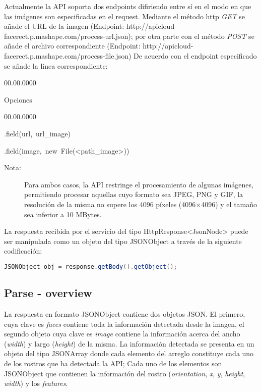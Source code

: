 Actualmente la API soporta dos endpoints difiriendo entre sí en el
modo en que las imágenes son especificadas en el request. Mediante
el método http \emph{GET} se añade el URL de la imagen (Endpoint:
http://apicloud-facerect.p.mashape.com/process-url.json); por otra
parte con el método \emph{POST} se añade el archivo correspondiente
(Endpoint: http://apicloud-facerect.p.mashape.com/process-file.json)
De acuerdo con el endpoint especificado se añade la línea correspondiente: 
\begin{lyxlist}{00.00.0000}
\item [{Opciones}]~

\begin{lyxlist}{00.00.0000}
\item [{.field(url,~url\_image)}]~
\item [{.field(image,~new~File(<path\_image>))}]~
\end{lyxlist}
\end{lyxlist}
\begin{description}
\item [{Nota:}] Para ambos casos, la API restringe el procesamiento de
algunas imágenes, permitiendo procesar aquellas cuyo formato sea JPEG,
PNG y GIF, la resolución de la misma no supere los 4096 píxeles (4096×4096)
y el tamaño sea inferior a 10 MBytes. 
\end{description}
La respuesta recibida por el servicio del tipo HttpResponse<JsonNode>
puede ser manipulada como un objeto del tipo JSONObject a través de
la siguiente codificación: 

\begin{lstlisting}[language=Java,breaklines=true]
JSONObject obj = response.getBody().getObject();
\end{lstlisting}



\subsection*{Parse - overview}

La respuesta en formato JSONObject contiene dos objetos JSON. El primero,
cuya clave es \emph{faces} contiene toda la información detectada
desde la imagen, el segundo objeto cuya clave es \emph{image} contiene
la información acerca del ancho (\emph{width}) y largo (\emph{height})
de la misma. La información detectada se presenta en un objeto del
tipo JSONArray donde cada elemento del arreglo constituye cada uno
de los rostros que ha detectada la API; Cada uno de los elementos
son JSONObject que contienen la información del rostro (\emph{orientation},
\emph{x}, \emph{y}, \emph{height}, \emph{width}) y los \emph{features}. 

